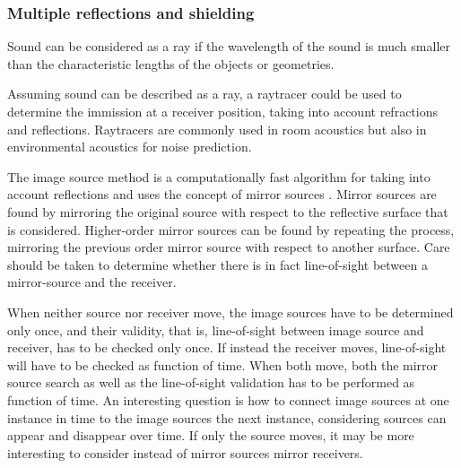 




\subsubsection{Multiple reflections and shielding} %
Sound can be considered as a ray if the wavelength of the sound is much smaller
than the characteristic lengths of the objects or geometries. %

Assuming sound can be described as a ray, a raytracer could be used to determine
the immission at a receiver position, taking into account refractions and
reflections. Raytracers are commonly used in room acoustics but also in
environmental acoustics for noise prediction.

The image source method is a computationally fast algorithm for taking into
account reflections and uses the concept of mirror sources
\cite{Allen1979,Mechel2013}. Mirror sources are found by mirroring the original
source with respect to the reflective surface that is considered. Higher-order
mirror sources can be found by repeating the process, mirroring the previous
order mirror source with respect to another surface. Care should be taken to
determine whether there is in fact line-of-sight between a mirror-source and the
receiver.

When neither source nor receiver move, the image sources have to be determined
only once, and their validity, that is, line-of-sight between image source and
receiver, has to be checked only once. If instead the receiver moves,
line-of-sight will have to be checked as function of time. When both move, both
the mirror source search as well as the line-of-sight validation has to be
performed as function of time. An interesting question is how to connect image
sources at one instance in time to the image sources the next instance,
considering sources can appear and disappear over time. If only the source
moves, it may be more interesting to consider instead of mirror sources mirror
receivers.









